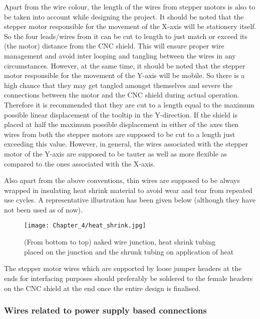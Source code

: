 Apart from the wire colour, the length of the wires from stepper motors is also to be taken into account while designing the project. It should be noted that the stepper motor responsible for the movement of the X-axis will be stationery itself. So the four leads/wires from it can be cut to length to just match or exceed its (the motor) distance from the CNC shield. This will ensure proper wire management and avoid inter looping and tangling between the wires in any circumstances. However, at the same time, it should be noted that the stepper motor responsible for the movement of the Y-axis will be mobile. So there is a high chance that they may get tangled amongst themselves and severe the connections between the motor and the CNC shield during actual operation. Therefore it is recommended that they are cut to a length equal to the maximum possible linear displacement of the tooltip in the Y-direction. If the shield is placed at half the maximum possible displacement in either of the axes then wires from both the stepper motors are supposed to be cut to a length just exceeding this value. However, in general, the wires associated with the stepper motor of the Y-axis are supposed to be tauter as well as more flexible as compared to the ones associated with the X-axis. \par

Also apart from the above conventions, thin wires are supposed to be always wrapped in insulating heat shrink material to avoid wear and tear from repeated use cycles. A representative illustration has been given below (although they have not been used as of now). \par

\begin{figure}[h]
 \centering
 \texttt{[image: Chapter\_4/heat\_shrink.jpg]}
 \caption{(From bottom to top) naked wire junction, heat shrink tubing placed on the junction and the shrunk tubing on application of heat}
 \label{fig:shrink}
\end{figure}

The stepper motor wires which are supported by loose jumper headers at the ends for interfacing purposes should preferably be soldered to the female headers on the CNC shield at the end once the entire design is finalised.

\subsubsection*{Wires related to power supply based connections}

